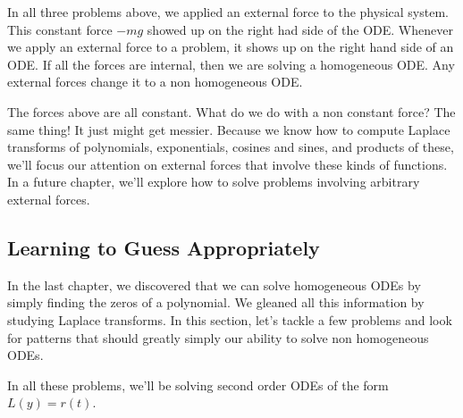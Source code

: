 In all three problems above, we applied an external force to the physical system.  This constant force $-mg$ showed up on the right had side of the ODE. Whenever we apply an external force to a problem, it shows up on the right hand side of an ODE. If all the forces are internal, then we are solving a homogeneous ODE.  Any external forces change it to a non homogeneous ODE.

The forces above are all constant.  What do we do with a non constant force?  The same thing! It just might get messier. 
Because we know how to compute Laplace transforms of polynomials, exponentials, cosines and sines, and products of these, we'll focus our attention on external forces that involve these kinds of functions. In a future chapter, we'll explore how to solve problems involving arbitrary external forces.

\subsection{Learning to Guess Appropriately}

In the last chapter, we discovered that we can solve homogeneous ODEs by simply finding the zeros of a polynomial.  We gleaned all this information by studying Laplace transforms. In this section, let's tackle a few problems and look for patterns that should greatly simply our ability to solve non homogeneous ODEs.  

In all these problems, we'll be solving second order ODEs of the form $L(y)=r(t)$.

